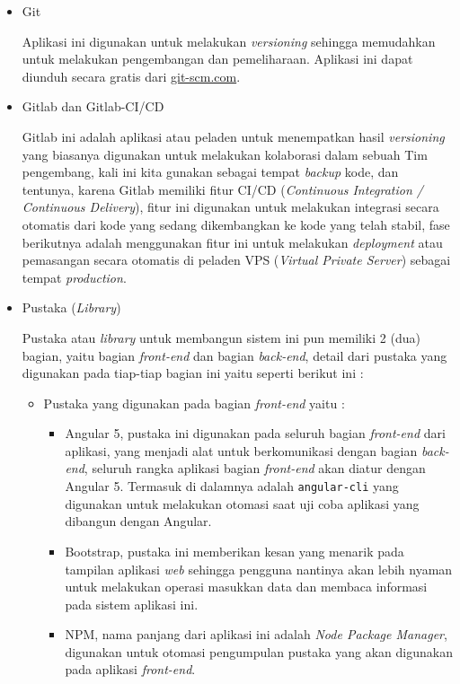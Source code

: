 \documentclass[pdftex,12pt, oneside]{article}
\begin{document}
\begin{itemize}
	\item Git
	
	Aplikasi ini digunakan untuk melakukan \textit{versioning} sehingga memudahkan untuk melakukan pengembangan dan pemeliharaan. Aplikasi ini dapat diunduh secara gratis dari \url{git-scm.com}.
	
	\item Gitlab dan Gitlab-CI/CD
	
	Gitlab ini adalah aplikasi atau peladen untuk menempatkan hasil \textit{versioning} yang biasanya digunakan untuk melakukan kolaborasi dalam sebuah Tim pengembang, kali ini kita gunakan sebagai tempat \textit{backup} kode, dan tentunya, karena Gitlab memiliki fitur CI/CD (\textit{Continuous Integration /  Continuous Delivery}), fitur ini digunakan untuk melakukan integrasi secara otomatis dari kode yang sedang dikembangkan ke kode yang telah stabil, fase berikutnya adalah menggunakan fitur ini untuk melakukan \textit{deployment} atau pemasangan secara otomatis di peladen VPS (\textit{Virtual Private Server}) sebagai tempat \textit{production}.
	
	\item Pustaka (\textit{Library})
	
Pustaka atau \textit{library} untuk membangun sistem ini pun memiliki 2 (dua) bagian, yaitu bagian \textit{front-end} dan bagian \textit{back-end}, detail dari pustaka yang digunakan pada tiap-tiap bagian ini yaitu seperti berikut ini :

		\begin{itemize}
			\item Pustaka yang digunakan pada bagian \textit{front-end} yaitu :
			
			\begin{itemize}
				\item Angular 5, pustaka ini digunakan pada seluruh bagian \textit{front-end} dari aplikasi, yang menjadi alat untuk berkomunikasi dengan bagian \textit{back-end}, seluruh rangka aplikasi bagian \textit{front-end} akan diatur dengan Angular 5. Termasuk di dalamnya adalah \texttt{angular-cli} yang digunakan untuk melakukan otomasi saat uji coba aplikasi yang dibangun dengan Angular.
				\item Bootstrap, pustaka ini memberikan kesan yang menarik pada tampilan aplikasi \textit{web} sehingga pengguna nantinya akan lebih nyaman untuk melakukan operasi masukkan data dan membaca informasi pada sistem aplikasi ini.
				\item NPM, nama panjang dari aplikasi ini adalah \textit{Node Package Manager}, digunakan untuk otomasi pengumpulan pustaka yang akan digunakan pada aplikasi \textit{front-end}.
			\end{itemize}
			

\end{itemize}
\end{itemize}
\end{document}

